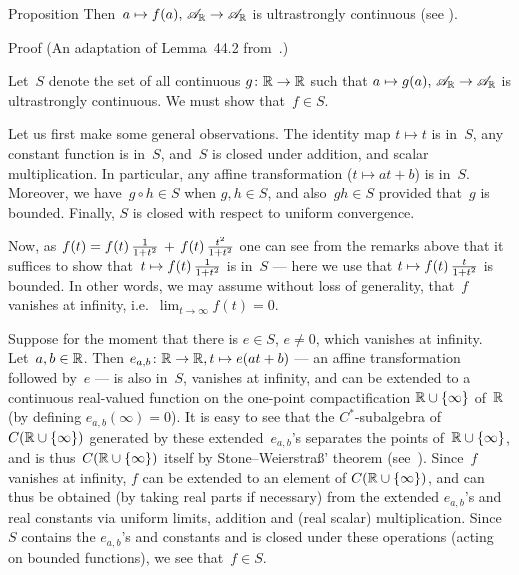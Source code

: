 \documentclass[a]{subfiles}
\begin{document}
\begin{parsec}
\begin{point}{Proposition}
Then~$a\mapsto f(a),\,\mathscr{A}_{\mathbb{R}}\to\mathscr{A}_{\mathbb{R}}$ is ultrastrongly continuous
(see ).
\begin{point}{Proof}%
(An adaptation of Lemma~44.2 from~\cite{conway2000}.)

Let~$S$ denote the set of all continuous $g\colon \mathbb{R}\to\mathbb{R}$
such that $a\mapsto g(a),\,\mathscr{A}_{\mathbb{R}}\to\mathscr{A}_{\mathbb{R}}$
is ultrastrongly continuous.
We must show that~$f\in S$.

Let us first make some general observations.
The identity map $t\mapsto t$ is in~$S$,
any constant function is in~$S$,
and~$S$ is closed under addition,
and scalar multiplication.
In particular, any affine transformation ($t\mapsto at+b$)
is in~$S$.
Moreover, we have~$g\circ h\in S$ when $g,h\in S$,
and also~$gh\in S$
provided that~$g$ is bounded.
Finally, $S$ is closed with respect to uniform convergence.

Now,
as $f(t)=f(t)\,\smash{\frac{1}{1+t^2}\,+\, f(t)\,\frac{t^2}{1+t^2}}$
 one can see from the remarks above
that it suffices
to show
that~$t\mapsto f(t)\,\smash{\frac{1}{1+t^2}}$ is in~$S$
--- here we use that $t\mapsto f(t) \,\smash{\frac{t}{1+t^2}}$ is bounded.
In other words,
we may assume without loss of generality,
that~$f$ vanishes at infinity, i.e.~$\lim_{t\to \infty}f(t)=0$.

Suppose for the moment
that there is $e\in S$, $e\neq 0$,
which vanishes at infinity.
Let~$a,b\in \mathbb{R}$.
Then $e_{a,b}\colon \mathbb{R}\to\mathbb{R}, t\mapsto e(at+b)$
--- an affine transformation followed by~$e$ ---
is also in~$S$,
vanishes at infinity,
and can be extended to a continuous real-valued
function on the one-point compactification $\mathbb{R}\cup \{ \infty\}$
of~$\mathbb{R}$
(by defining $e_{a,b}(\infty)=0$).
It is easy to see that the $C^*$-subalgebra
of~$C(\mathbb{R}\cup\{\infty\})$
generated by these extended~$e_{a,b}$'s 
separates the points of~$\mathbb{R}\cup\{\infty\}$,
and is thus~$C(\mathbb{R}\cup\{\infty\})$ itself
by Stone--Weierstra\ss' theorem (see~).
Since~$f$ vanishes at infinity,
$f$ can be extended to an element of $C(\mathbb{R}\cup\{\infty\})$,
 and can thus be obtained
(by taking real parts if necessary)
from the extended $e_{a,b}$'s and real constants 
via uniform limits, addition and (real scalar)
multiplication. 
Since~$S$ contains the $e_{a,b}$'s and constants
and is closed under these operations (acting on bounded functions),
we see that~$f\in S$.


\end{point}
\end{point}
\end{parsec}
\end{document}
